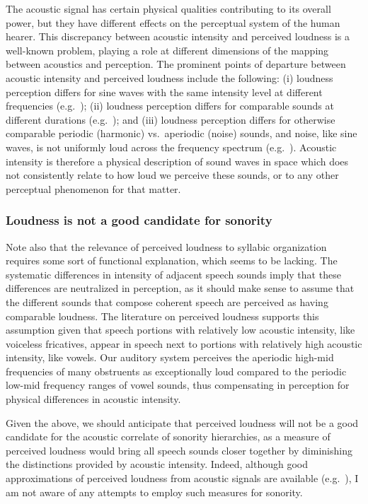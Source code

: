 The acoustic signal has certain physical qualities contributing to its overall power, but they have different effects on the perceptual system of the human hearer. This discrepancy between acoustic intensity and perceived loudness is a well-known problem, playing a role at different dimensions of the mapping between acoustics and perception.
The prominent points of departure between acoustic intensity and perceived loudness include
the following:
(i) loudness perception differs for sine waves with the same intensity level at different frequencies (e.g.~\citealt{fletcher1933loudness, plack1995loudness, suzuki2004equal});
(ii) loudness perception differs for comparable sounds at different durations (e.g.~\cites{turk1996processing}[143]{moore2013anintro}{olsen2010loudness}{seshadri2009perceived});
and (iii) loudness perception differs for otherwise comparable periodic (harmonic) vs.~aperiodic (noise) sounds, and noise, like sine waves, is not uniformly loud across the frequency spectrum (e.g.~\cites{hellman1972asymmetry}{bao2010psychoacousticsk}[140]{moore2013anintro}).
Acoustic intensity is therefore a physical description of sound waves in space which does not consistently relate to how loud we perceive these sounds, or to any other perceptual phenomenon for that matter.

\subsubsection{Loudness is not a good candidate for sonority}\label{sec:loudness}

Note also that the relevance of perceived loudness to syllabic organization requires some sort of functional explanation, which seems to be lacking.
The systematic differences in intensity of adjacent speech sounds imply that these differences are neutralized in perception, as it should make sense to assume that the different sounds that compose coherent speech are perceived as having comparable loudness.
The literature on perceived loudness supports this assumption given that speech portions with relatively low acoustic intensity, like voiceless fricatives, appear in speech next to portions with relatively high acoustic intensity, like vowels.
Our auditory system perceives the aperiodic high-mid frequencies of many obstruents as exceptionally loud compared to the periodic low-mid frequency ranges of vowel sounds, thus compensating in perception for physical differences in acoustic intensity.

Given the above, we should anticipate that perceived loudness will not be a good candidate for the acoustic correlate of sonority hierarchies, as a measure of perceived loudness would bring all speech sounds closer together by diminishing the distinctions provided by acoustic intensity. Indeed, although good approximations of perceived loudness from acoustic signals are available (e.g.~\citealt{seshadri2009perceived, itu2015algorithmssk, lund2014loudnesssk, skovenborg2012loudnesssk}), I am not aware of any attempts to employ such measures for sonority.

